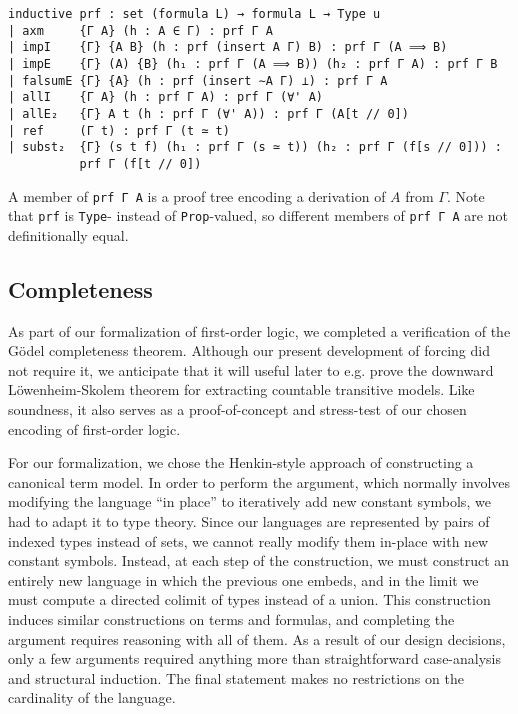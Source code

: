 \documentclass[a4paper,USenglish,cleveref, autoref]{lipics-v2019}
\newcommand{\lil}{\lstinline}
\theoremstyle{theorem}
\theoremstyle{definition}
\begin{document}
\begin{lstlisting}
inductive prf : set (formula L) → formula L → Type u
| axm     {Γ A} (h : A ∈ Γ) : prf Γ A
| impI    {Γ} {A B} (h : prf (insert A Γ) B) : prf Γ (A ⟹ B)
| impE    {Γ} (A) {B} (h₁ : prf Γ (A ⟹ B)) (h₂ : prf Γ A) : prf Γ B
| falsumE {Γ} {A} (h : prf (insert ∼A Γ) ⊥) : prf Γ A
| allI    {Γ A} (h : prf Γ A) : prf Γ (∀' A)
| allE₂   {Γ} A t (h : prf Γ (∀' A)) : prf Γ (A[t // 0])
| ref     (Γ t) : prf Γ (t ≃ t)
| subst₂  {Γ} (s t f) (h₁ : prf Γ (s ≃ t)) (h₂ : prf Γ (f[s // 0])) :
          prf Γ (f[t // 0])
\end{lstlisting}

A member of \lil{prf Γ A} is a proof tree encoding a derivation of $A$ from $\Gamma$. Note that \lil{prf} is \lil{Type}- instead of \lil{Prop}-valued, so different members of \lil{prf Γ A} are not definitionally equal.

\subsection{Completeness}
As part of our formalization of first-order logic, we completed a verification of the G\"odel completeness theorem. Although our present development of forcing did not require it, we anticipate that it will useful later to e.g. prove the downward L\"owenheim-Skolem theorem for extracting countable transitive models. Like soundness, it also serves as a proof-of-concept and stress-test of our chosen encoding of first-order logic.

For our formalization, we chose the Henkin-style approach of constructing a canonical term model. In order to perform the argument, which normally involves modifying the language ``in place'' to iteratively add new constant symbols, we had to adapt it to type theory. Since our languages are represented by pairs of indexed types instead of sets, we cannot really modify them in-place with new constant symbols. Instead, at each step of the construction, we must construct an entirely new language in which the previous one embeds, and in the limit we must compute a directed colimit of types instead of a union. This construction induces similar constructions on terms and formulas, and completing the argument requires reasoning with all of them. As a result of our design decisions, only a few arguments required anything more than straightforward case-analysis and structural induction. The final statement makes no restrictions on the cardinality of the language.
\end{document}
